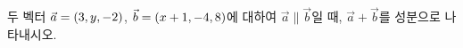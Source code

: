 두 벡터 $\vec{a}=(3{,}\mkern3mu\mathopen{}y{,}\mkern3mu\mathopen{}-2)$, $\vec{b}=(x+1{,}\mkern3mu\mathopen{}-4{,}\mkern3mu\mathopen{}8)$에 대하여 $\vec{a}\parallel\vec{b}$일 때, $\vec{a}+\vec{b}$를 성분으로 나타내시오.
